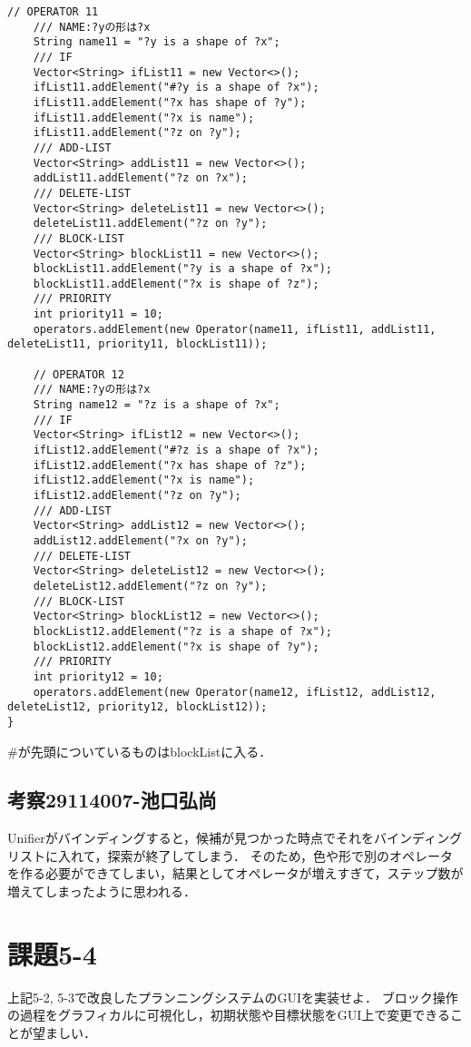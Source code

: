 \documentclass{jarticle}
\begin{document}
\begin{lstlisting}[caption=色や形を扱うオペレータ,label=src:operator]
    // OPERATOR 11
    /// NAME:?yの形は?x
    String name11 = "?y is a shape of ?x";
    /// IF
    Vector<String> ifList11 = new Vector<>();
    ifList11.addElement("#?y is a shape of ?x");
    ifList11.addElement("?x has shape of ?y");
    ifList11.addElement("?x is name");
    ifList11.addElement("?z on ?y");
    /// ADD-LIST
    Vector<String> addList11 = new Vector<>();
    addList11.addElement("?z on ?x");
    /// DELETE-LIST
    Vector<String> deleteList11 = new Vector<>();
    deleteList11.addElement("?z on ?y");
    /// BLOCK-LIST
    Vector<String> blockList11 = new Vector<>();
    blockList11.addElement("?y is a shape of ?x");
    blockList11.addElement("?x is shape of ?z");
    /// PRIORITY
    int priority11 = 10;
    operators.addElement(new Operator(name11, ifList11, addList11, deleteList11, priority11, blockList11));
    
    // OPERATOR 12
    /// NAME:?yの形は?x
    String name12 = "?z is a shape of ?x";
    /// IF
    Vector<String> ifList12 = new Vector<>();
    ifList12.addElement("#?z is a shape of ?x");
    ifList12.addElement("?x has shape of ?z");
    ifList12.addElement("?x is name");
    ifList12.addElement("?z on ?y");
    /// ADD-LIST
    Vector<String> addList12 = new Vector<>();
    addList12.addElement("?x on ?y");
    /// DELETE-LIST
    Vector<String> deleteList12 = new Vector<>();
    deleteList12.addElement("?z on ?y");
    /// BLOCK-LIST
    Vector<String> blockList12 = new Vector<>();
    blockList12.addElement("?z is a shape of ?x");
    blockList12.addElement("?x is shape of ?y");
    /// PRIORITY
    int priority12 = 10;
    operators.addElement(new Operator(name12, ifList12, addList12, deleteList12, priority12, blockList12));
}
\end{lstlisting}

\#が先頭についているものはblockListに入る．

\subsection{考察29114007-池口弘尚}
Unifierがバインディングすると，候補が見つかった時点でそれをバインディングリストに入れて，探索が終了してしまう．
そのため，色や形で別のオペレータを作る必要ができてしまい，結果としてオペレータが増えすぎて，ステップ数が増えてしまったように思われる．


\section{課題5-4}
\begin{screen}
    上記5-2, 5-3で改良したプランニングシステムのGUIを実装せよ．
    ブロック操作の過程をグラフィカルに可視化し，初期状態や目標状態をGUI上で変更できることが望ましい．
\end{screen}
\end{document}
